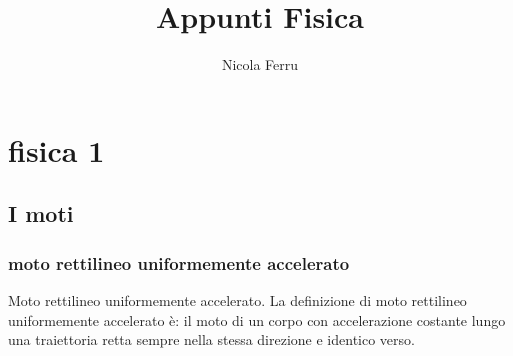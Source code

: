 \documentclass{book}
\title{Appunti Fisica}
\author{Nicola Ferru}
\date{}
\begin{document}
\maketitle
\tableofcontents
\listoftables
\listoffigures


\part{fisica 1}

\chapter{I moti}
\section{moto rettilineo uniformemente accelerato}
Moto rettilineo uniformemente accelerato. La definizione di moto rettilineo uniformemente accelerato è: il moto di un corpo con accelerazione costante lungo una traiettoria retta sempre nella stessa direzione e identico verso.
\end{document}
